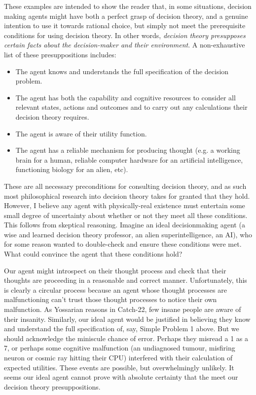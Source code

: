 \documentclass{article}
\begin{document}
These examples are intended to show the reader that, in some situations, decision making agents might have both a perfect grasp of decision theory, and a genuine intention to use it towards rational choice, but simply not meet the prerequisite conditions for using decision theory. In other words, \textit{decision theory presupposes certain facts about the decision-maker and their environment}. A non-exhaustive list of these presuppositions includes:

\begin{itemize}  
\item The agent knows and understands the full specification of the decision problem.
\item The agent has both the capability and cognitive resources to consider all relevant states, actions and outcomes and to carry out any calculations their decision theory requires.
\item The agent is aware of their utility function.
\item The agent has a reliable mechanism for producing thought (e.g. a working brain for a human, reliable computer hardware for an artificial intelligence, functioning biology for an alien, etc).
\end{itemize}

These are all necessary preconditions for consulting decision theory, and as such most philosophical research into decision theory takes for granted that they hold. However, I believe any agent with physically-real existence must entertain some small degree of uncertainty about whether or not they meet all these conditions. This follows from skeptical reasoning. Imagine an ideal decisionmaking agent (a wise and learned decision theory professor, an alien superintelligence, an AI), who for some reason wanted to double-check and ensure these conditions were met. What could convince the agent that these conditions hold?

Our agent might introspect on their thought process and check that their thoughts are proceeding in a reasonable and correct manner. Unfortunately, this is clearly a circular process because an agent whose thought processes are malfunctioning can't trust those thought processes to notice their own malfunction. As Yossarian reasons in Catch-22, few insane people are aware of their insanity. Similarly, our ideal agent would be justified in believing they know and understand the full specification of, say, Simple Problem 1 above. But we should acknowledge the miniscule chance of error. Perhaps they misread a 1 as a 7, or perhaps some cognitive malfunction (an undiagnosed tumour, misfiring neuron or cosmic ray hitting their CPU) interfered with their calculation of expected utilities. These events are possible, but overwhelmingly unlikely. It seems our ideal agent cannot prove with absolute certainty that the meet our decision theory presuppositions.
\end{document}

